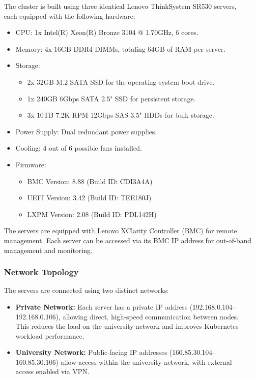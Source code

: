 The cluster is built using three identical Lenovo ThinkSystem SR530 servers, each equipped with the following hardware:

\begin{itemize}
\item CPU: 1x Intel(R) Xeon(R) Bronze 3104 @ 1.70GHz, 6 cores.
\item Memory: 4x 16GB DDR4 DIMMs, totaling 64GB of RAM per server.
\item Storage:
\begin{itemize}
\item 2x 32GB M.2 SATA SSD for the operating system boot drive.
\item 1x 240GB 6Gbps SATA 2.5" SSD for persistent storage.
\item 3x 10TB 7.2K RPM 12Gbps SAS 3.5" HDDs for bulk storage.
\end{itemize}
\item Power Supply: Dual redundant power supplies.
\item Cooling: 4 out of 6 possible fans installed.
\item Firmware:
\begin{itemize}
\item BMC Version: 8.88 (Build ID: CDI3A4A)
\item UEFI Version: 3.42 (Build ID: TEE180J)
\item LXPM Version: 2.08 (Build ID: PDL142H)
\end{itemize}
\end{itemize}

The servers are equipped with Lenovo XClarity Controller (BMC) for remote management. Each server can be accessed via its BMC IP address for out-of-band management and monitoring.

\subsubsection{Network Topology}

The servers are connected using two distinct networks:

\begin{itemize}
\item \textbf{Private Network:} Each server has a private IP address (192.168.0.104–192.168.0.106), allowing direct, high-speed communication between nodes. This reduces the load on the university network and improves Kubernetes workload performance.
\item \textbf{University Network:} Public-facing IP addresses (160.85.30.104–160.85.30.106) allow access within the university network, with external access enabled via VPN.
\end{itemize}

